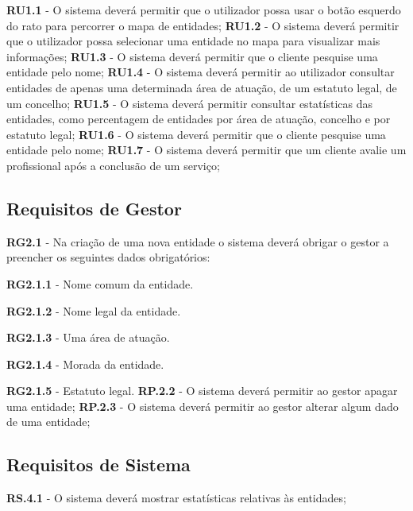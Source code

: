 \documentclass{scrreprt}
\begin{document}
\textbf{RU1.1} - O sistema deverá permitir que o utilizador possa usar o botão esquerdo do rato para percorrer o mapa de entidades;
\newline
\textbf{RU1.2} - O sistema deverá permitir que o utilizador possa selecionar uma entidade no mapa para visualizar mais informações;
\newline
\textbf{RU1.3} - O sistema deverá permitir que o cliente pesquise uma entidade pelo nome;
\newline
\textbf{RU1.4} - O sistema deverá permitir ao utilizador consultar entidades de apenas uma determinada área de atuação, de um estatuto legal, de um concelho;
\newline
\textbf{RU1.5} - O sistema deverá permitir consultar estatísticas das entidades, como percentagem de entidades por área de atuação, concelho e por estatuto legal;
\newline
\textbf{RU1.6} - O sistema deverá permitir que o cliente pesquise uma entidade pelo nome;
\newline
\textbf{RU1.7} - O sistema deverá permitir que um cliente avalie um profissional após a conclusão de um serviço;

\subsection{Requisitos de Gestor}

\textbf{RG2.1} - Na criação de uma nova entidade o sistema deverá obrigar o gestor a preencher os seguintes dados obrigatórios:

\textbf{RG2.1.1} - Nome comum da entidade.

\textbf{RG2.1.2} - Nome legal da entidade.

\textbf{RG2.1.3} - Uma área de atuação.

\textbf{RG2.1.4} - Morada da entidade.

\textbf{RG2.1.5} - Estatuto legal.
\newline
\textbf{RP.2.2} - O sistema deverá permitir ao gestor apagar uma entidade;
\newline
\textbf{RP.2.3} - O sistema deverá permitir ao gestor alterar algum dado de uma entidade;

\subsection{Requisitos de Sistema}

\textbf{RS.4.1} - O sistema deverá mostrar estatísticas relativas às entidades;
\end{document}
